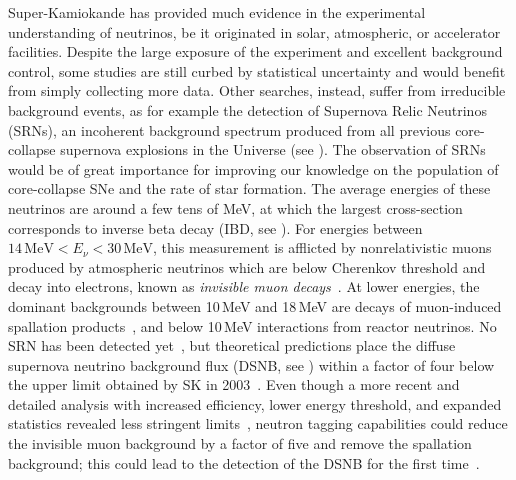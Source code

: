 Super-Kamiokande has provided %
much evidence in the experimental understanding of neutrinos, %
be it originated in solar, atmospheric, or accelerator facilities.
Despite the large exposure of the experiment and excellent background control, %
some studies are still curbed by statistical uncertainty and would benefit from simply collecting more data.
Other searches, instead, suffer from irreducible background events, as for example the detection of Supernova Relic Neutrinos (SRNs), %
an incoherent background spectrum produced from all previous core-collapse supernova explosions in the Universe (see ).
The observation of SRNs would be of great importance for improving our knowledge on the population of core-collapse SNe %
and the rate of star formation.
The average energies of these neutrinos are around a few tens of MeV, at which the largest cross-section %
corresponds to inverse beta decay (IBD, see ).
For energies between $14\,\text{MeV} < E_\nu < 30\,\text{MeV}$, %
this measurement is afflicted by nonrelativistic muons produced by atmospheric neutrinos %
which are below Cherenkov threshold and decay into electrons, %
known as \emph{invisible muon decays}~\cite{Kaplinghat:1999xi}.
At lower energies, the dominant backgrounds between 10\,MeV and 18\,MeV are decays of muon-induced spallation products~\cite{Li:2015kpa}, %
and below 10\,MeV interactions from reactor neutrinos.
No SRN has been detected yet~\cite{Bays:2011si, Zhang:2013tua}, but %
theoretical predictions place the diffuse supernova neutrino background flux (DSNB, see ) %
within a factor of four below the upper limit obtained by SK in 2003~\cite{Malek:2002ns, Horiuchi:2008jz}.
Even though a more recent and detailed analysis with increased efficiency, lower energy threshold, and expanded statistics %
revealed less stringent limits~\cite{Bays:2011si}, neutron tagging capabilities could reduce %
the invisible muon background by a factor of five and remove the spallation background; %
this could lead to the detection of the DSNB for the first time~\cite{Laha:2013hva}.


